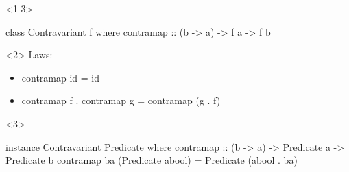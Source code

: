 \documentclass[UKenglish,usenames,dvipsnames,svgnames,table,aspectratio=169,mathserif]{beamer}
\newcommand{\nl}{\vspace{\baselineskip}}
\begin{document}
\begin{frame}[fragile]
\begin{overlayarea}{\textwidth}{0.5\textheight}

\begin{onlyenv}<1-3>
\begin{haskellcode}
class Contravariant f where
  contramap :: (b -> a) -> f a -> f b
\end{haskellcode}

\nl
\end{onlyenv}

\begin{onlyenv}<2>
Laws:

\begin{itemize}
\item[]
\begin{haskellcode}
contramap id = id
\end{haskellcode}
\item[]
\begin{haskellcode}
contramap f . contramap g = contramap (g . f)
\end{haskellcode}
\end{itemize}
\end{onlyenv}
\begin{onlyenv}<3>
\begin{haskellcode}
instance Contravariant Predicate where
  contramap :: (b -> a) -> Predicate a -> Predicate b
  contramap ba (Predicate abool) = Predicate (abool . ba)
\end{haskellcode}
\end{onlyenv}

\end{overlayarea}
\end{frame}



\end{document}
